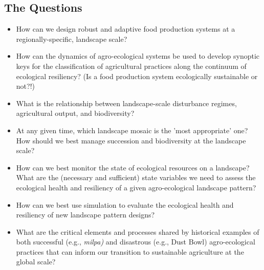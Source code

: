 \documentclass[noback]{psuposter}
\begin{document}
\subsection{The Questions}    
\begin{itemize}
\item How can we design robust and adaptive food production systems at a regionally-specific, landscape scale?
\item How can the dynamics of agro-ecological systems be used to develop synoptic keys for the classification of agricultural practices along the continuum of ecological resiliency? (Is a food production system ecologically sustainable or not?!)
\item What is the relationship between landscape-scale disturbance regimes, agricultural output, and biodiversity?
\item At any given time, which landscape mosaic is the 'most appropriate' one? How should we best manage succession and biodiversity at the landscape scale? 
\item How can we best monitor the state of ecological resources on a landscape? What are the (necessary and sufficient) state variables we need to assess the ecological health and resiliency of a given agro-ecological landscape pattern? 
\item How can we best use simulation to evaluate the ecological health and resiliency of new landscape pattern designs? 
\item What are the critical elements and processes shared by historical examples of both successful (e.g., \textit{milpa)} and disastrous (e.g., Dust Bowl) agro-ecological practices that can inform our transition to sustainable agriculture at the global scale?
\end{itemize}
\columnbreak
%
\end{document}
